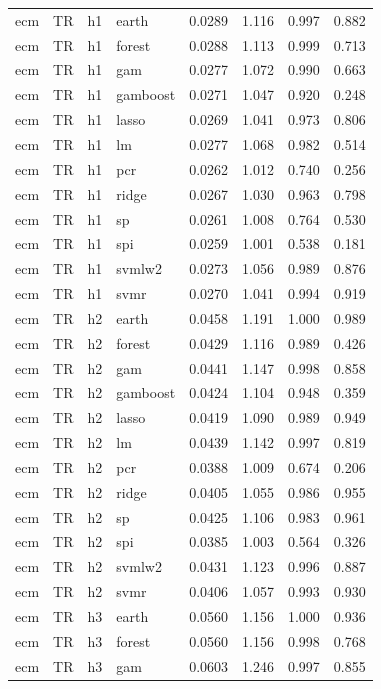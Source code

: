 \begin{ThreePartTable}
\begin{longtable}[t]{llclcccc}
\addlinespace
ecm & TR & h1 & earth & 0.0289 & 1.116 & 0.997 & 0.882\\
ecm & TR & h1 & forest & 0.0288 & 1.113 & 0.999 & 0.713\\
ecm & TR & h1 & gam & 0.0277 & 1.072 & 0.990 & 0.663\\
ecm & TR & h1 & gamboost & 0.0271 & 1.047 & 0.920 & 0.248\\
ecm & TR & h1 & lasso & 0.0269 & 1.041 & 0.973 & 0.806\\
ecm & TR & h1 & lm & 0.0277 & 1.068 & 0.982 & 0.514\\
ecm & TR & h1 & pcr & 0.0262 & 1.012 & 0.740 & 0.256\\
ecm & TR & h1 & ridge & 0.0267 & 1.030 & 0.963 & 0.798\\
ecm & TR & h1 & sp & 0.0261 & 1.008 & 0.764 & 0.530\\
ecm & TR & h1 & spi & 0.0259 & 1.001 & 0.538 & 0.181\\
ecm & TR & h1 & svmlw2 & 0.0273 & 1.056 & 0.989 & 0.876\\
ecm & TR & h1 & svmr & 0.0270 & 1.041 & 0.994 & 0.919\\
\addlinespace
ecm & TR & h2 & earth & 0.0458 & 1.191 & 1.000 & 0.989\\
ecm & TR & h2 & forest & 0.0429 & 1.116 & 0.989 & 0.426\\
ecm & TR & h2 & gam & 0.0441 & 1.147 & 0.998 & 0.858\\
ecm & TR & h2 & gamboost & 0.0424 & 1.104 & 0.948 & 0.359\\
ecm & TR & h2 & lasso & 0.0419 & 1.090 & 0.989 & 0.949\\
ecm & TR & h2 & lm & 0.0439 & 1.142 & 0.997 & 0.819\\
ecm & TR & h2 & pcr & 0.0388 & 1.009 & 0.674 & 0.206\\
ecm & TR & h2 & ridge & 0.0405 & 1.055 & 0.986 & 0.955\\
ecm & TR & h2 & sp & 0.0425 & 1.106 & 0.983 & 0.961\\
ecm & TR & h2 & spi & 0.0385 & 1.003 & 0.564 & 0.326\\
ecm & TR & h2 & svmlw2 & 0.0431 & 1.123 & 0.996 & 0.887\\
ecm & TR & h2 & svmr & 0.0406 & 1.057 & 0.993 & 0.930\\
\addlinespace
ecm & TR & h3 & earth & 0.0560 & 1.156 & 1.000 & 0.936\\
ecm & TR & h3 & forest & 0.0560 & 1.156 & 0.998 & 0.768\\
ecm & TR & h3 & gam & 0.0603 & 1.246 & 0.997 & 0.855\\

\end{longtable}
\end{ThreePartTable}
